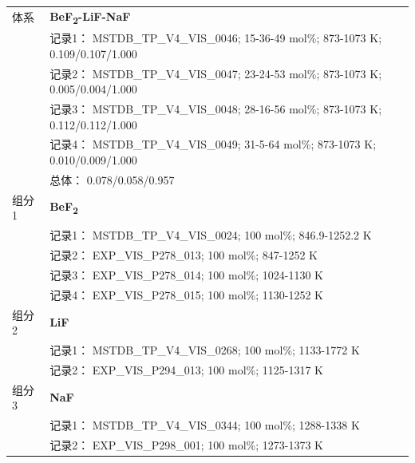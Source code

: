 \documentclass[12pt]{article}
\begin{document}
{\begin{longtable}[]{@{}
  >{\raggedright\arraybackslash}p{}
  >{\raggedright\arraybackslash}p{}@{}}
\midrule
体系 & \textbf{BeF\textsubscript{2}-LiF-NaF} \\
 & 记录1： MSTDB\_TP\_V4\_VIS\_0046; 15-36-49 mol\%; 873-1073 K; 0.109/0.107/1.000 \\
 & 记录2： MSTDB\_TP\_V4\_VIS\_0047; 23-24-53 mol\%; 873-1073 K; 0.005/0.004/1.000 \\
 & 记录3： MSTDB\_TP\_V4\_VIS\_0048; 28-16-56 mol\%; 873-1073 K; 0.112/0.112/1.000 \\
 & 记录4： MSTDB\_TP\_V4\_VIS\_0049; 31-5-64 mol\%; 873-1073 K; 0.010/0.009/1.000 \\
 & 总体： 0.078/0.058/0.957  \\

组分 1  & \textbf{BeF\textsubscript{2}} \\
 & 记录1： MSTDB\_TP\_V4\_VIS\_0024; 100 mol\%; 846.9-1252.2 K \\
 & 记录2： EXP\_VIS\_P278\_013; 100 mol\%; 847-1252 K \\
 & 记录3： EXP\_VIS\_P278\_014; 100 mol\%; 1024-1130 K \\
 & 记录4： EXP\_VIS\_P278\_015; 100 mol\%; 1130-1252 K  \\

组分 2  & \textbf{LiF} \\
 & 记录1： MSTDB\_TP\_V4\_VIS\_0268; 100 mol\%; 1133-1772 K \\
 & 记录2： EXP\_VIS\_P294\_013; 100 mol\%; 1125-1317 K  \\

组分 3  & \textbf{NaF} \\
 & 记录1： MSTDB\_TP\_V4\_VIS\_0344; 100 mol\%; 1288-1338 K \\
 & 记录2： EXP\_VIS\_P298\_001; 100 mol\%; 1273-1373 K  \\


\end{longtable}}
\end{document}
